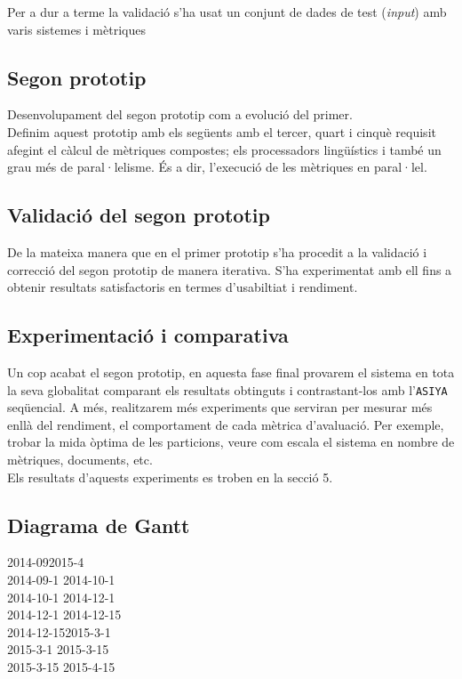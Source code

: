 \documentclass[11pt,a4paper]{article}
\begin{document}
Per a dur a terme la validació s'ha usat un conjunt de dades de test (\textit{input}) amb varis sistemes i mètriques

\subsection{Segon prototip}
Desenvolupament del segon prototip com a evolució del primer.
\\

Definim aquest prototip amb els següents amb el tercer, quart i cinquè requisit afegint el càlcul de mètriques compostes; els processadors lingüístics i també un grau més de paral·lelisme. És a dir, l'execució de les mètriques en paral·lel. 

\subsection{Validació del segon prototip}
De la mateixa manera que en el primer prototip s'ha procedit a la validació i correcció del segon prototip de manera iterativa. S’ha experimentat amb  ell fins a obtenir resultats satisfactoris en termes d'usabiltiat i  rendiment.

\subsection{Experimentació i comparativa}
Un cop acabat el segon prototip, en aquesta fase final provarem el sistema en tota la seva globalitat comparant els resultats obtinguts i contrastant-los amb l'\texttt{ASIYA} seqüencial. A més, realitzarem més experiments que serviran per mesurar més enllà del rendiment, el comportament de cada mètrica d'avaluació. Per exemple, trobar la mida òptima de les particions, veure com escala el sistema en nombre de mètriques, documents, etc.
\\

Els resultats d'aquests experiments es troben en la secció 5.

\subsection{Diagrama de Gantt}

\begin{ganttchart}[
	hgrid,
	vgrid,
	time slot format=isodate-yearmonth,
	compress calendar
	]{2014-09}{2015-4}
	 \\
		{2014-09-1} {2014-10-1}  \\
	  			{2014-10-1} {2014-12-1}  \\
	 			{2014-12-1} {2014-12-15} \\
	  			{2014-12-15}{2015-3-1}  \\
	 			{2015-3-1}  {2015-3-15}   \\
	 		{2015-3-15} {2015-4-15}   \\
\end{ganttchart}
\end{document}
